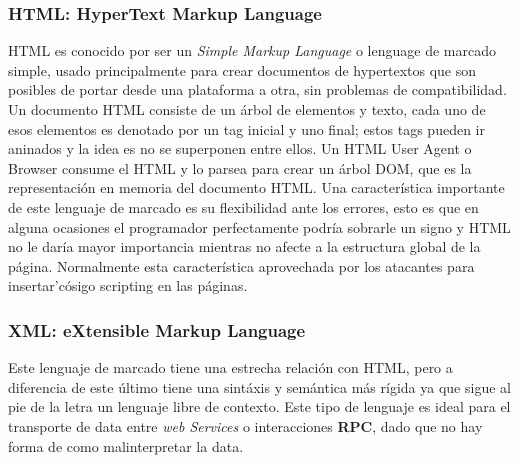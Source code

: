         \subsubsection{HTML: HyperText Markup Language}
        \label{chap2:HTML}
        HTML \cite{htmlSpec} es conocido por ser un \textit{Simple Markup Language} o lenguage de marcado simple, usado principalmente para crear documentos de hypertextos que son posibles de portar desde una plataforma a otra, sin problemas de compatibilidad. Un documento HTML consiste de un árbol de elementos y texto, cada uno de esos elementos es denotado por un tag inicial y uno final; estos tags pueden ir aninados y la idea es no se superponen entre ellos. Un HTML User Agent o Browser consume el HTML y lo parsea para crear un árbol DOM, que es la representación en memoria del documento HTML.
        Una característica importante de este lenguaje de marcado es su flexibilidad ante los errores, esto es que en alguna ocasiones el programador perfectamente podría sobrarle un signo y HTML no le daría mayor importancia mientras no afecte a la estructura global de la página. Normalmente esta característica aprovechada por los atacantes para insertar'cósigo scripting en las páginas.


        \subsubsection{XML: eXtensible Markup Language}
        \label{chap2:XML}
        Este lenguaje de marcado tiene una estrecha relación con HTML, pero a diferencia de este último tiene una sintáxis y semántica más rígida ya que sigue al pie de la letra un lenguaje libre de contexto. Este tipo de lenguaje es ideal para el transporte de data entre \textit{web Services} o interacciones \textbf{RPC}, dado que no hay forma de como malinterpretar la data.


